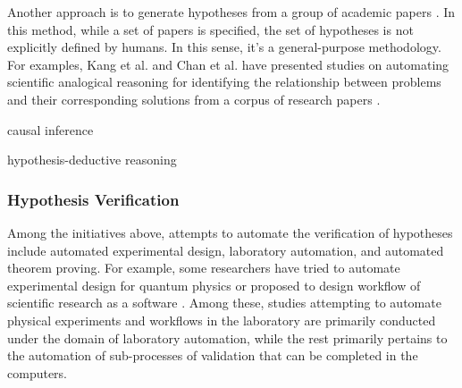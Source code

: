

Another approach is to generate hypotheses from a group of academic papers \cite{kang2022augmenting,chan2018solvent,wang2023learning,xu2023exploring,yang2023large}. In this method, while a set of papers is specified, the set of hypotheses is not explicitly defined by humans. In this sense, it's a general-purpose methodology. For examples, Kang et al. and Chan et al. have presented studies on automating scientific analogical reasoning for identifying the relationship between problems and their corresponding solutions from a corpus of research papers \cite{kang2022augmenting,chan2018solvent}.

causal inference 

hypothesis-deductive reasoning \cite{vervoort2023criterion}







\subsubsection{Hypothesis Verification}
Among the initiatives above, attempts to automate the verification of hypotheses include automated experimental design, laboratory automation, and automated theorem proving. For example, some researchers have tried to automate experimental design for quantum physics \cite{ruiz2022digital} or proposed to design workflow of scientific research as a software \cite{goble2020fair}. Among these, studies attempting to automate physical experiments and workflows in the laboratory are primarily conducted under the domain of laboratory automation, while the rest primarily pertains to the automation of sub-processes of validation that can be completed in the computers.

